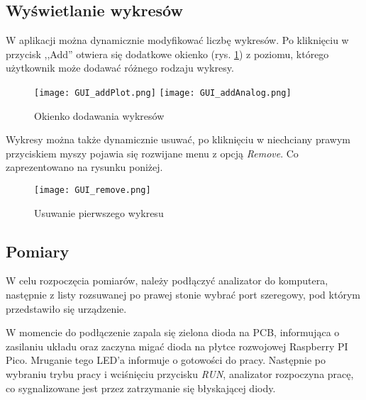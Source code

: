     \subsection{Wyświetlanie wykresów}
        W aplikacji można dynamicznie modyfikować liczbę wykresów.
        Po kliknięciu w przycisk ,,Add'' otwiera się dodatkowe okienko (rys. \ref{fig:gui_addPlot}) z poziomu,
        którego użytkownik może dodawać różnego rodzaju wykresy.
        \begin{figure}[!ht]
            \centering
            \texttt{[image: GUI\_addPlot.png]}
            \texttt{[image: GUI\_addAnalog.png]}
            \caption{Okienko dodawania wykresów}
            \label{fig:gui_addPlot}
        \end{figure}

        Wykresy można także dynamicznie usuwać, po kliknięciu w niechciany prawym przyciskiem myszy pojawia się rozwijane menu z opcją \textit{Remove}.
        Co zaprezentowano na rysunku poniżej.

        \begin{figure}[!ht]
            \centering
            \texttt{[image: GUI\_remove.png]}
            \caption{Usuwanie pierwszego wykresu}
            \label{fig:gui_removePlot}
        \end{figure}

    
    \subsection{Pomiary}
        W celu rozpoczęcia pomiarów, należy podłączyć analizator do komputera, 
        następnie z listy rozsuwanej po prawej stonie wybrać port szeregowy,
        pod którym przedstawiło się urządzenie.

        W momencie do podłączenie zapala się zielona dioda na PCB, informująca o zasilaniu układu oraz zaczyna migać dioda na płytce rozwojowej Raspberry PI Pico.
        Mruganie tego LED'a informuje o gotowości do pracy.
        Następnie po wybraniu trybu pracy i wciśnięciu przycisku \textit{RUN}, analizator rozpoczyna pracę, co sygnalizowane jest przez zatrzymanie się błyskającej diody.
        